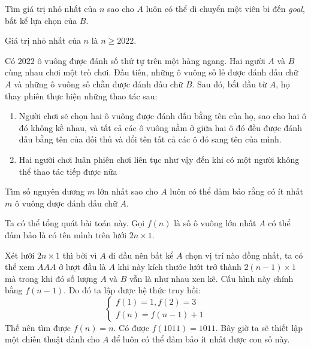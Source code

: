 \documentclass[11pt]{scrartcl}
\begin{document}
\begin{itemize}[label=, leftmargin=0em, itemsep=0.5em]
\begin{bt}
        Tìm giá trị nhỏ nhất của $n$ sao cho $A$ luôn có thể di chuyển một viên bi đến \textit{goal}, bất kể lựa chọn của $B$.
    \end{bt}
    \begin{sol}
        Giá trị nhỏ nhất của $n$ là $n \geq 2022$.
    \end{sol}
    \begin{bt}
        Có $2022$ ô vuông được đánh số thứ tự trên một hàng ngang. Hai người $A$ và $B$ cùng nhau chơi một trò chơi. Đầu tiên, những ô vuông số lẻ được đánh dấu chữ $A$ và những ô vuông số chẵn được đánh dấu chữ $B$. Sau đó, bắt đầu từ $A$, họ thay phiên thực hiện những thao tác sau:
        \begin{enumerate}
            \item Người chơi sẽ chọn hai ô vuông được đánh dấu bằng tên của họ, sao cho hai ô đó không kề nhau, và tất cả các ô vuông nằm ở giữa hai ô đó đều được đánh dấu bằng tên của đối thủ và đổi tên tất cả các ô đó sang tên của mình.
            \item Hai người chơi luân phiên chơi liên tục như vậy đến khi có một người không thể thao tác tiếp được nữa
        \end{enumerate}
        Tìm số nguyên dương $m$ lớn nhất sao cho $A$ luôn có thể đảm bảo rằng có ít nhất $m$ ô vuông được đánh dấu chữ $A$.
    \end{bt}

    \begin{sol}
        Ta có thể tổng quát bài toán này. Gọi $f(n)$ là số ô vuông lớn nhất $A$ có thể đảm bảo là có tên mình trên lưới $2n \times 1$.


        Xét lưới $2n \times 1$ thì bởi vì $A$ đi đầu nên bất kể $A$ chọn vị trí nào đồng nhất, ta có thể xem $AAA$ ở lượt đầu là $A$ khi này kích thước lướt trở thành $2(n - 1) \times 1$ mà trong khi đó số lượng $A$ và $B$ vẫn là như nhau xen kẽ. Cấu hình này chính bằng $f(n - 1)$. Do đó ta lập được hệ thức truy hồi:
        \[
            \left\{
                \begin{array}{l}
                    f(1) = 1, f(2) = 3\\
                    f(n) = f(n - 1) + 1
                \end{array}
            \right.
        \]
        Thế nên tìm được $f(n) = n$. Có được $f(1011) = 1011$. Bây giờ ta sẽ thiết lập một chiến thuật dành cho $A$ để luôn có thể đảm bảo ít nhất được con số này. 



\end{sol}
\end{itemize}
\end{document}
